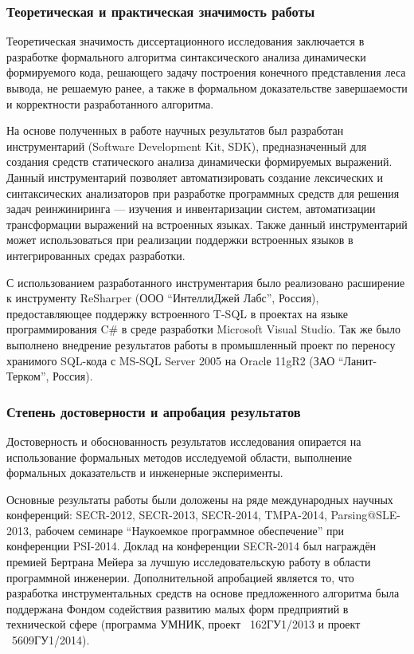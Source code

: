 \subsubsection*{\large{Теоретическая и практическая значимость работы}}

Теоретическая значимость диссертационного исследования заключается в разработке формального алгоритма синтаксического анализа динамически формируемого кода, решающего задачу построения конечного представления леса вывода, не решаемую ранее, а также в формальном доказательстве завершаемости и корректности разработанного алгоритма. 

На основе полученных в работе научных результатов был разработан инструментарий (Software Development Kit, SDK), предназначенный для создания средств статического анализа динамически формируемых выражений. Данный инструментарий позволяет автоматизировать создание лексических и синтаксических анализаторов при разработке программных средств для решения задач реинжиниринга --- изучения и инвентаризации систем, автоматизации трансформации выражений на встроенных языках. Также данный инструментарий может использоваться при реализации поддержки встроенных языков в интегрированных средах разработки.

С использованием разработанного инструментария было реализовано расширение к инструменту ReSharper (ООО ``ИнтеллиДжей Лабс'', Россия), предоставляющее поддержку встроенного T-SQL в проектах на языке программирования C\# в среде разработки Microsoft Visual Studio. Так же было выполнено внедрение результатов работы в промышленный проект по переносу хранимого SQL-кода с MS-SQL Server 2005 на Oraclе 11gR2 (ЗАО ``Ланит-Терком'', Россия). 


\subsubsection*{\large{Степень достоверности и апробация результатов}}

Достоверность и обоснованность результатов исследования опирается на использование формальных методов исследуемой области, выполнение формальных доказательств и инженерные эксперименты.

Основные результаты работы были доложены на ряде международных научных конференций: SECR-2012, SECR-2013, SECR-2014, TMPA-2014, Parsing@SLE-2013, рабочем семинаре ``Наукоемкое программное обеспечение'' при конференции PSI-2014. Доклад на конференции SECR-2014 был награждён премией Бертрана Мейера за лучшую исследовательскую работу в области программной инженерии. Дополнительной апробацией является то, что разработка инструментальных средств на основе предложенного алгоритма была поддержана Фондом содействия развитию малых форм предприятий в технической сфере (программа УМНИК, проект \textnumero~162ГУ1/2013 и проект \textnumero~5609ГУ1/2014).

